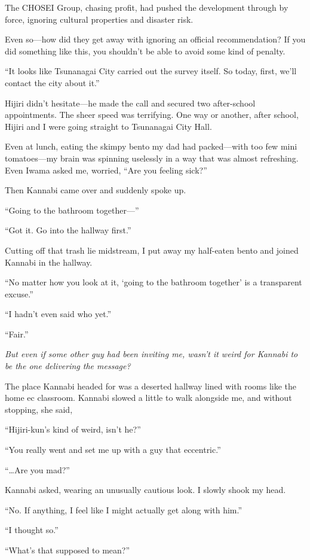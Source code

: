 \documentclass[
    a4paper,
    12pt,
    twoside,
    openany,
    UTF8,
    fontset=windows
]{ctexbook}
\begin{document}
The CHOSEI Group, chasing profit, had pushed the development through by force, ignoring cultural properties and disaster risk.

Even so---how did they get away with ignoring an official recommendation? If you did something like this, you shouldn't be able to avoid some kind of penalty.

``It looks like Tsunanagai City carried out the survey itself. So today, first, we'll contact the city about it.''

Hijiri didn't hesitate---he made the call and secured two after-school appointments. The sheer speed was terrifying. One way or another, after school, Hijiri and I were going straight to Tsunanagai City Hall.

Even at lunch, eating the skimpy bento my dad had packed---with too few mini tomatoes---my brain was spinning uselessly in a way that was almost refreshing. Even Iwama asked me, worried, ``Are you feeling sick?''

Then Kannabi came over and suddenly spoke up.

``Going to the bathroom together---''

``Got it. Go into the hallway first.''

Cutting off that trash lie midstream, I put away my half-eaten bento and joined Kannabi in the hallway.

``No matter how you look at it, `going to the bathroom together' is a transparent excuse.''

``I hadn't even said who yet.''

``Fair.''

\textit{But even if some other guy had been inviting me, wasn't it weird for Kannabi to be the one delivering the message?}

The place Kannabi headed for was a deserted hallway lined with rooms like the home ec classroom. Kannabi slowed a little to walk alongside me, and without stopping, she said,

``Hijiri-kun's kind of weird, isn't he?''

``You really went and set me up with a guy that eccentric.''

``\dots Are you mad?''

Kannabi asked, wearing an unusually cautious look. I slowly shook my head.

``No. If anything, I feel like I might actually get along with him.''

``I thought so.''

``What's that supposed to mean?''
\end{document}
